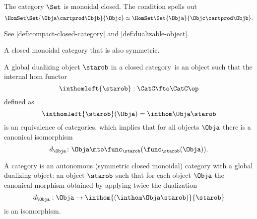 \begin{example}
    The category $\Set$ is monoidal closed.
    The condition
    spells out
    \begin{equation}
        \HomSet\Set{\Obja\cartprod\Objb}{\Objc} \simeq \HomSet\Set{\Obja}{\Objc\cartprod\Objb}.
    \end{equation}

\end{example}

See \cref{def:compact-closed-category} and \cref{def:dualizable-object}.

%
%

\begin{definition}
    \label{def:autonomous-category}
    A closed monoidal category that is also symmetric.
\end{definition}

\begin{definition}\label{def:global-dualizing-object}
    A global dualizing object $\starob$ in a closed category~\CatC is an object such that the internal hom functor
    \begin{equation}
        \inthomleft{\starob}: \CatC \fto \CatC\op
    \end{equation}
    defined as
    \begin{equation}
        \inthomleft{\starob}(\Obja) = \inthom\Obja\starob
    \end{equation}
    is an equivalence of categories, which implies that for all objects $\Obja$ there is a canonical isomorphism
    \begin{equation}
        d_{\Obja}\colon\Obja\mto \func_{\starob}(\func_{\starob}(\Obja)).
    \end{equation}
\end{definition}

\begin{definition}
    \label{def:star-autonomous-category-1}
    A \starautonomous category is an autonomous (symmetric closed monoidal) category with a global dualizing object: an object $\starob$ such that for each object $\Obja$ the canonical morphism
    obtained by applying twice the dualization
    \begin{equation}
        d_{\Obja}: \Obja \to \inthom{(\inthom\Obja\starob)}{\starob}
    \end{equation}
    is an isomorphism.
\end{definition}

